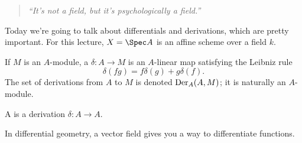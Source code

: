 \begin{quote}\textit{
	``It's not a field, but it's psychologically a field.''
}\end{quote}

Today we're going to talk about differentials and derivations, which are pretty important. For this lecture, $X =
\Spec A$ is an affine scheme over a field $k$.
\begin{defn}
If $M$ is an $A$-module, a  $\delta\colon A\to M$ is an $A$-linear map satisfying the Leibniz rule
\[\delta(fg) = f\delta(g) + g\delta(f).\]
The set of derivations from $A$ to $M$ is denoted $\operatorname{Der}_A(A, M)$; it is naturally an $A$-module.

A  is a derivation $\delta\colon A\to A$.
\end{defn}
In differential geometry, a vector field gives you a way to differentiate functions.

